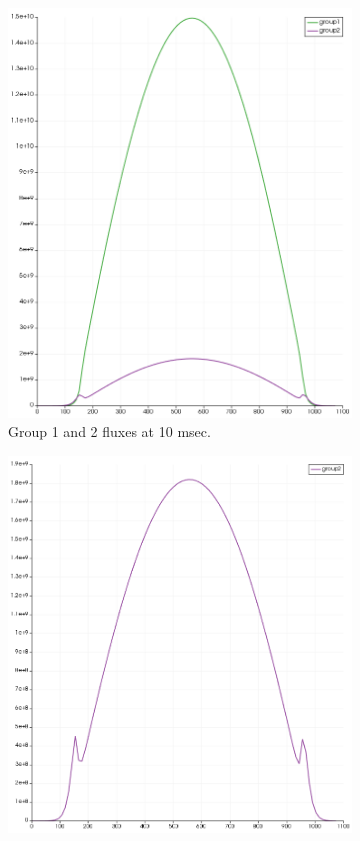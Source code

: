 \documentclass[11pt,letterpaper]{article}
\begin{document}
	\begin{figure}[htbp!]
		\centering
		\begin{subfigure}[t]{0.4\textwidth}
			\centering
			\includegraphics[width=\linewidth]{1D-fuel-reflec}
			\caption{Group 1 and 2 fluxes at 10 msec.}
		\end{subfigure}
		\begin{subfigure}[t]{0.4\textwidth}
			\centering
			\includegraphics[width=\linewidth]{1D-fuel-reflec-g2}

\end{subfigure}
\end{figure}
\end{document}
